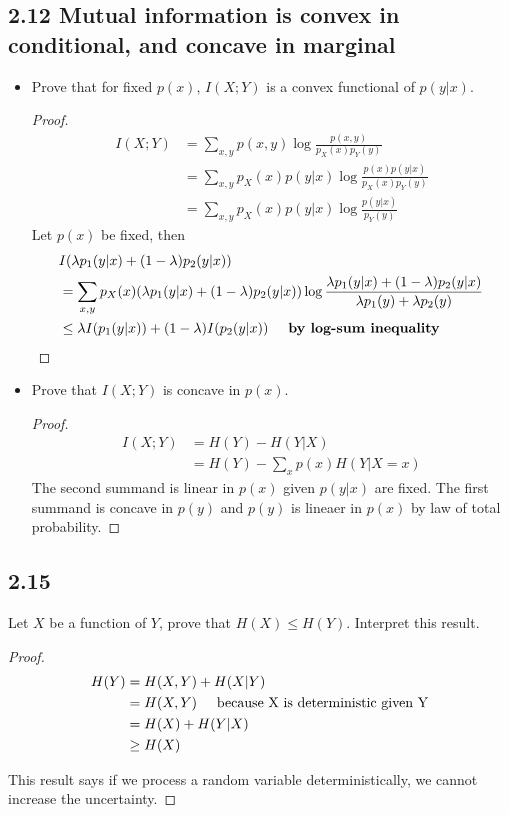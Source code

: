 \documentclass[../main.tex]{subfiles}
\begin{document}
\subsection*{2.12 Mutual information is convex in conditional, and concave in marginal}
\begin{itemize}
    \item Prove that for fixed $p(x)$, $I(X;Y)$ is a convex functional of $p(y|x)$.
    \begin{proof}
        \begin{align*}
            I(X;Y)&=\sum_{x,y}p(x,y)\log\frac{p(x,y)}{p_X(x)p_Y(y)}\\
            &=\sum_{x,y}p_X(x)p(y|x)\log\frac{p(x)p(y|x)}{p_X(x)p_Y(y)}\\
            &=\sum_{x,y}p_X(x)p(y|x)\log\frac{p(y|x)}{p_Y(y)}
        \end{align*}
        Let $p(x)$ be fixed, then \begin{align*}
            &I(\lambda p_1(y|x) + (1-\lambda)p_2(y|x))\\
            &= \sum_{x,y}p_X(x)(\lambda p_1(y|x) + (1-\lambda)p_2(y|x))\log\frac{\lambda p_1(y|x) + (1-\lambda)p_2(y|x)}{\lambda p_1(y) + \lambda p_2(y)}\\
            &\leq \lambda I( p_1(y|x)) + (1-\lambda)I(p_2(y|x)) \hspace{5mm} \textbf{by log-sum inequality}
        \end{align*}
    \end{proof}
    \item Prove that $I(X;Y)$ is concave in $p(x)$.
    \begin{proof}
        \begin{align*}
            I(X;Y)&=H(Y)-H(Y|X)\\
            &=H(Y)-\sum_x p(x)H(Y|X=x)
        \end{align*}
        The second summand is linear in $p(x)$ given $p(y|x)$ are fixed. The first summand is concave in $p(y)$ and $p(y)$ is lineaer in $p(x)$ by law of total probability.
    \end{proof}
\end{itemize}
\subsection*{2.15}
Let $X$ be a function of $Y$, prove that $H(X)\leq H(Y)$. Interpret this result.
\begin{proof}
    \begin{align*}
        H(Y) &= H(X,Y) + H(X|Y)\\
        &= H(X,Y) \hspace{5mm} \text{because X is deterministic given Y}\\
        &= H(X)+H(Y|X)\\
        &\geq H(X)
    \end{align*}
    
   This result says if we process a random variable deterministically, we cannot increase the uncertainty.
\end{proof}
\end{document}
